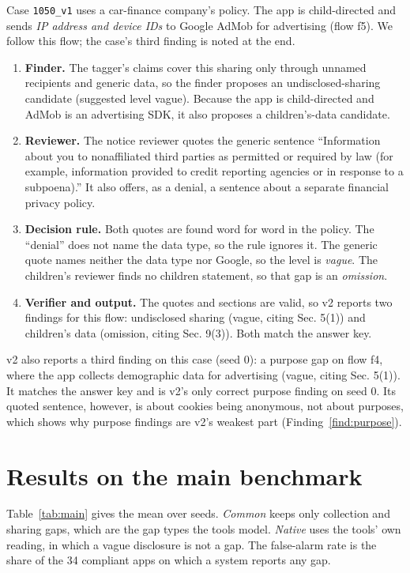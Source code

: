 \documentclass[11pt,a4paper]{article}
\begin{document}
Case \texttt{1050\_v1} uses a car-finance company's policy. The app is child-directed and sends
\emph{IP address and device IDs} to Google AdMob for advertising (flow f5). We follow this flow;
the case's third finding is noted at the end.
\begin{enumerate}
  \item \textbf{Finder.} The tagger's claims cover this sharing only through unnamed recipients and
        generic data, so the finder proposes an undisclosed-sharing candidate (suggested level
        vague). Because the app is child-directed and AdMob is an advertising SDK, it also proposes
        a children's-data candidate.
  \item \textbf{Reviewer.} The notice reviewer quotes the generic sentence ``Information about you
        to nonaffiliated third parties as permitted or required by law (for example, information
        provided to credit reporting agencies or in response to a subpoena).'' It also offers, as a
        denial, a sentence about a separate financial privacy policy.
  \item \textbf{Decision rule.} Both quotes are found word for word in the policy. The ``denial''
        does not name the data type, so the rule ignores it. The generic quote names neither the
        data type nor Google, so the level is \emph{vague}. The children's reviewer finds no
        children statement, so that gap is an \emph{omission}.
  \item \textbf{Verifier and output.} The quotes and sections are valid, so v2 reports two findings
        for this flow: undisclosed sharing (vague, citing Sec. 5(1)) and children's data (omission,
        citing Sec. 9(3)). Both match the answer key.
\end{enumerate}
v2 also reports a third finding on this case (seed 0): a purpose gap on flow f4, where the app
collects demographic data for advertising (vague, citing Sec. 5(1)). It matches the answer key and
is v2's only correct purpose finding on seed 0. Its quoted sentence, however, is about cookies being
anonymous, not about purposes, which shows why purpose findings are v2's weakest part
(Finding~\ref{find:purpose}).

\section{Results on the main benchmark}

Table~\ref{tab:main} gives the mean over seeds. \emph{Common} keeps only collection and sharing
gaps, which are the gap types the tools model. \emph{Native} uses the tools' own reading, in which a
vague disclosure is not a gap. The false-alarm rate is the share of the 34 compliant apps on which a
system reports any gap.
\end{document}
